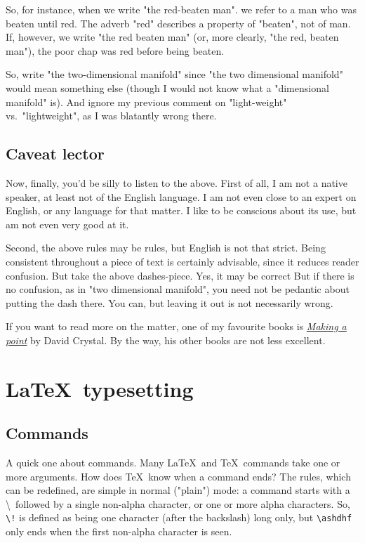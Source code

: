 \documentclass{article}
\begin{document}
So, for instance, when we write "the red-beaten man". we refer to a man who was beaten until red.  The adverb "red" describes a property of "beaten", not of man.  If, however, we write "the red beaten man" (or, more clearly, "the red, beaten man"), the poor chap was red before being beaten.

So, write "the two-dimensional manifold" since "the two dimensional manifold" would mean something else (though I would not know what a "dimensional manifold" is).  And ignore my previous comment on "light-weight" vs.\ "lightweight", as I was blatantly wrong there.


\subsection{Caveat lector}

Now, finally, you'd be silly to listen to the above.
First of all, I am not a native speaker, at least not of the English language.  
I am not even close to an expert on English, or any language for that matter.
I like to be conscious about its use, but am not even very good at it.

Second, the above rules may be rules, but English is not that strict.
Being consistent throughout a piece of text is certainly advisable, since it reduces reader confusion.
But take the above dashes-piece.
Yes, it may be correct
 But if there is no confusion, as in "two dimensional manifold", you need not be pedantic about putting the dash there.
 You can, but leaving it out is not necessarily wrong.

If you want to read more on the matter, one of my favourite books is \href{https://www.theguardian.com/books/2015/sep/17/making-a-point-pernickety-story-english-punctuation-david-crystal-review}{\textsl{Making a point}} by David Crystal. 
By the way, his other books are not less excellent.


\section{\LaTeX\ typesetting}
\subsection{Commands}
A quick one about commands.  Many \LaTeX\ and \TeX\ commands take one or more 
arguments. How does \TeX\ know when a command ends? The rules, which can be
redefined, are simple in normal ("plain") mode:
	a command starts with a \textbackslash\ followed by a single
  	non-alpha character, or one or more alpha characters.  So,
	\verb+\!+ is defined as being one character (after the backslash)
	long only, but \verb+\ashdhf+ only ends when the first non-alpha
	character is seen.
\end{document}
